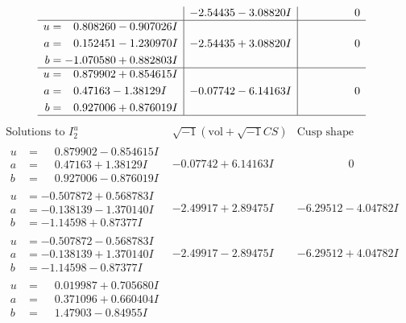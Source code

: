 \documentclass[1p]{elsarticle_modified}
\theoremstyle{definition}
\newcommand{\I}{\sqrt{-1}}
\begin{document}
$$\begin{array}{c|c|c}
 & -2.54435 - 3.08820 I & \phantom{-0.000000 } 0 \\ \hline\begin{aligned}
u &= \phantom{-}0.808260 - 0.907026 I \\
a &= \phantom{-}0.152451 - 1.230970 I \\
b &= -1.070580 + 0.882803 I\end{aligned}
 & -2.54435 + 3.08820 I & \phantom{-0.000000 } 0 \\ \hline\begin{aligned}
u &= \phantom{-}0.879902 + 0.854615 I \\
a &= \phantom{-}0.47163 - 1.38129 I \\
b &= \phantom{-}0.927006 + 0.876019 I\end{aligned}
 & -0.07742 - 6.14163 I & \phantom{-0.000000 } 0\\
 \hline 
 \end{array}$$\newpage$$\begin{array}{c|c|c}  
\text{Solutions to }I^u_{2}& \I (\text{vol} + \sqrt{-1}CS) & \text{Cusp shape}\\
 \hline 
\begin{aligned}
u &= \phantom{-}0.879902 - 0.854615 I \\
a &= \phantom{-}0.47163 + 1.38129 I \\
b &= \phantom{-}0.927006 - 0.876019 I\end{aligned}
 & -0.07742 + 6.14163 I & \phantom{-0.000000 } 0 \\ \hline\begin{aligned}
u &= -0.507872 + 0.568783 I \\
a &= -0.138139 - 1.370140 I \\
b &= -1.14598 + 0.87377 I\end{aligned}
 & -2.49917 + 2.89475 I & -6.29512 - 4.04782 I \\ \hline\begin{aligned}
u &= -0.507872 - 0.568783 I \\
a &= -0.138139 + 1.370140 I \\
b &= -1.14598 - 0.87377 I\end{aligned}
 & -2.49917 - 2.89475 I & -6.29512 + 4.04782 I \\ \hline\begin{aligned}
u &= \phantom{-}0.019987 + 0.705680 I \\
a &= \phantom{-}0.371096 + 0.660404 I \\
b &= \phantom{-}1.47903 - 0.84955 I\end{aligned}

\end{array}$$
\end{document}
